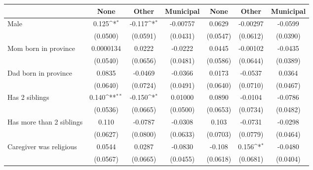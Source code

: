 {
\def\sym#1{\ifmmode^{#1}\else\(^{#1}\)\fi}
\begin{tabular}{l*{6}{c}}
\toprule
                    &\multicolumn{1}{c}{None}&\multicolumn{1}{c}{Other}&\multicolumn{1}{c}{Municipal}&\multicolumn{1}{c}{None}&\multicolumn{1}{c}{Other}&\multicolumn{1}{c}{Municipal}\\
\midrule
Male                &       0.125\sym{*}  &      -0.117\sym{*}  &    -0.00757         &      0.0629         &    -0.00297         &     -0.0599         \\
                    &    (0.0500)         &    (0.0591)         &    (0.0431)         &    (0.0547)         &    (0.0612)         &    (0.0390)         \\
\addlinespace
Mom born in province&   0.0000134         &      0.0222         &     -0.0222         &      0.0445         &    -0.00102         &     -0.0435         \\
                    &    (0.0540)         &    (0.0656)         &    (0.0481)         &    (0.0586)         &    (0.0644)         &    (0.0389)         \\
\addlinespace
Dad born in province&      0.0835         &     -0.0469         &     -0.0366         &      0.0173         &     -0.0537         &      0.0364         \\
                    &    (0.0640)         &    (0.0724)         &    (0.0491)         &    (0.0640)         &    (0.0710)         &    (0.0467)         \\
\addlinespace
Has 2 siblings      &       0.140\sym{**} &      -0.150\sym{*}  &     0.01000         &      0.0890         &     -0.0104         &     -0.0786         \\
                    &    (0.0536)         &    (0.0665)         &    (0.0500)         &    (0.0653)         &    (0.0734)         &    (0.0482)         \\
\addlinespace
Has more than 2 siblings&       0.110         &     -0.0787         &     -0.0308         &       0.103         &     -0.0731         &     -0.0298         \\
                    &    (0.0627)         &    (0.0800)         &    (0.0633)         &    (0.0703)         &    (0.0779)         &    (0.0464)         \\
\addlinespace
Caregiver was religious&      0.0544         &      0.0287         &     -0.0830         &      -0.108         &       0.156\sym{*}  &     -0.0480         \\
                    &    (0.0567)         &    (0.0665)         &    (0.0455)         &    (0.0618)         &    (0.0681)         &    (0.0404)         \\

\end{tabular}}
